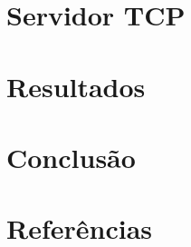 \documentclass[
	article,			%
	11pt,				%
	oneside,			%
	a4paper,			%
	hidelinks,
	english,			%
	brazil,				%
	sumario=abnt-6027-2012
	]{abntex2}
\begin{document}
\section{Servidor TCP}
\section{Resultados}
\section{Conclusão}
\section{Referências}


\end{document}

